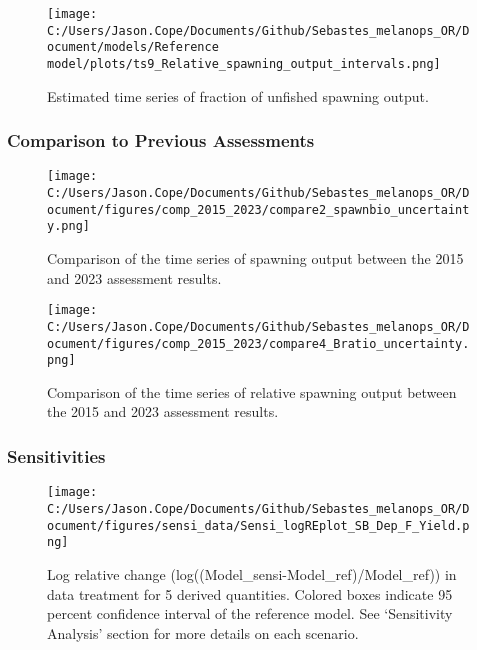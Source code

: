 \documentclass[11pt,
  english,
  letterpaper,
]{article}
\begin{document}
\begin{figure}
\centering
\texttt{[image: C:/Users/Jason.Cope/Documents/Github/Sebastes\_melanops\_OR/Document/models/Reference model/plots/ts9\_Relative\_spawning\_output\_intervals.png]}
\caption{Estimated time series of fraction of unfished spawning output.\label{fig:depl}}
\end{figure}

\newpage

\hypertarget{comparison-to-previous-assessments}{%
\subsubsection{Comparison to Previous Assessments}\label{comparison-to-previous-assessments}}

\begin{figure}
\centering
\texttt{[image: C:/Users/Jason.Cope/Documents/Github/Sebastes\_melanops\_OR/Document/figures/comp\_2015\_2023/compare2\_spawnbio\_uncertainty.png]}
\caption{Comparison of the time series of spawning output between the 2015 and 2023 assessment results.\label{fig:comp-ssb}}
\end{figure}

\newpage

\begin{figure}
\centering
\texttt{[image: C:/Users/Jason.Cope/Documents/Github/Sebastes\_melanops\_OR/Document/figures/comp\_2015\_2023/compare4\_Bratio\_uncertainty.png]}
\caption{Comparison of the time series of relative spawning output between the 2015 and 2023 assessment results.\label{fig:comp-depl}}
\end{figure}

\newpage

\hypertarget{sensitivities}{%
\subsubsection{Sensitivities}\label{sensitivities}}

\begin{figure}
\centering
\texttt{[image: C:/Users/Jason.Cope/Documents/Github/Sebastes\_melanops\_OR/Document/figures/sensi\_data/Sensi\_logREplot\_SB\_Dep\_F\_Yield.png]}
\caption{Log relative change (log((Model\_sensi-Model\_ref)/Model\_ref)) in data treatment for 5 derived quantities. Colored boxes indicate 95 percent confidence interval of the reference model. See `Sensitivity Analysis' section for more details on each scenario.\label{fig:sensi-data-RE}}
\end{figure}
\end{document}
